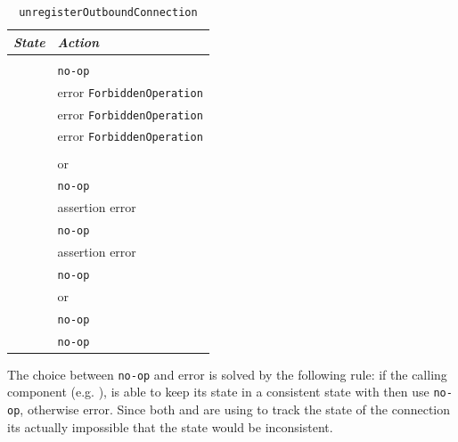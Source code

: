 \begin{table}
  \begin{tabular}[h]{ll}
    \textit{State}           & \textit{Action} \\\hline\\[2pt]
    \InitialState{}          & \texttt{no-op} \\[8pt]
    \ReservedOutboundState{} & error \texttt{ForbiddenOperation} \\[8pt]
    \UnnegotiatedStateOut{}  & error \texttt{ForbiddenOperation} \\[8pt]
    \UnnegotiatedStateIn{}   & error \texttt{ForbiddenOperation} \\[8pt]
    \OutboundStateAny{}      & \DemotedToColdAnyLoc{} \\[8pt]
    \OutboundStateDupTau{}   & \Prune{} or \DemotedToColdDupLoc{} \\[8pt]
    \OutboundIdleStateAny{}  & \texttt{no-op} \\[8pt]
    \InboundIdleStateUni{}   & assertion error \\[8pt]
    \InboundIdleStateDup{}   & \texttt{no-op} \\[8pt]
    \InboundStateUni{}       & assertion error \\[8pt]
    \InboundStateDup{}       & \texttt{no-op} \\[8pt]
    \DuplexState{}           & \Prune{} or \DemotedToColdDupLoc{} \\[8pt]
    \TerminatingState{}      & \texttt{no-op} \\[8pt]
    \TerminatedState{}       & \texttt{no-op} \\[8pt]
  \end{tabular}
  \caption{\texttt{unregisterOutboundConnection}}
  \label{table:unregisterOutboundConnection}
\end{table}

The choice between \texttt{no-op} and error is solved by the following rule: if
the calling component (e.g. \ptopgov{}), is able to keep its state in
a consistent state with \connmngr{} then use \texttt{no-op}, otherwise
error.  Since both \inbgov{} and \ptopgov{} are using \mux{} to track the state
of the connection its actually impossible that the state would be inconsistent.

